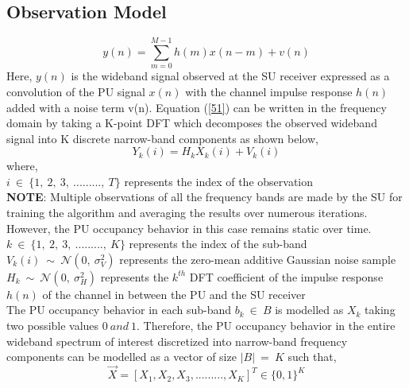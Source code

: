 \documentclass[12pt, draftcls, onecolumn]{IEEEtran}
\begin{document}
\subsection{Observation Model}
\begin{equation}\label{51}
    y(n) = \sum_{m=0}^{M-1} h(m)x(n-m) + v(n)
\end{equation}
Here, $y(n)$ is the wideband signal observed at the SU receiver expressed as a convolution of the PU signal $x(n)$ with the channel impulse response $h(n)$ added with a noise term v(n).
Equation (\ref{51}) can be written in the frequency domain by taking a K-point DFT which decomposes the observed wideband signal into K discrete narrow-band components as shown below,
\begin{equation}\label{52}
    Y_k(i) = H_kX_k(i) + V_k(i)
\end{equation}
where,
\\$i\ \in\ \{1,\ 2,\ 3,\ .........,\ T\}$ represents the index of the observation
\\\textbf{NOTE}: Multiple observations of all the frequency bands are made by the SU for training the algorithm and averaging the results over numerous iterations. However, the PU occupancy behavior in this case remains static over time.
\\$k\ \in\ \{1,\ 2,\ 3,\ .........,\ K\}$ represents the index of the sub-band
\\$V_k(i)\ \sim\ \mathcal{N}(0,\ \sigma_V^2)$ represents the zero-mean additive Gaussian noise sample
\\$H_k\ \sim\ \mathcal{N}(0,\ \sigma_H^2)$ represents the $k^{th}$ DFT coefficient of the impulse response $h(n)$ of the channel in between the PU and the SU receiver
\\The PU occupancy behavior in each sub-band $b_k\ \in\ B$ is modelled as $X_k$ taking two possible values $0\ and\ 1$. Therefore, the PU occupancy behavior in the entire wideband spectrum of interest discretized into narrow-band frequency components can be modelled as a vector of size $|B|\ =\ K$ such that,
\begin{equation}\label{53}
    \vec{X} = [X_1, X_2, X_3, ........., X_K]^T \in \{0,1\}^K
\end{equation}
\end{document}
